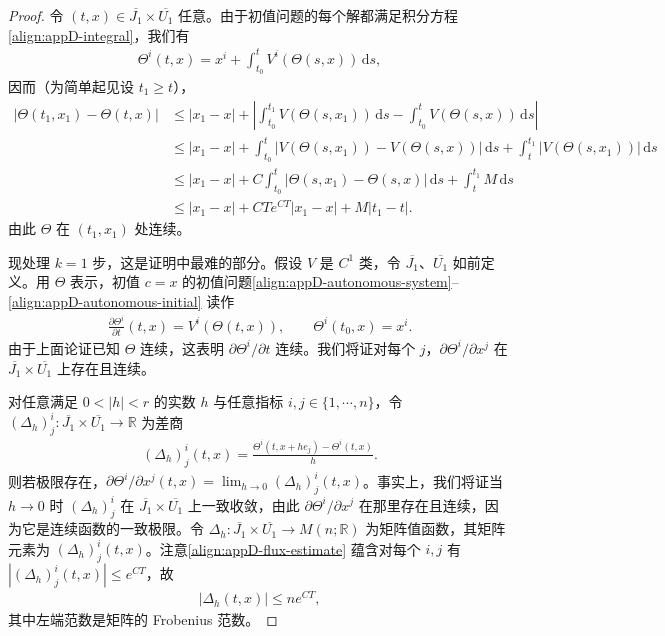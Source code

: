 \documentclass[../../main.tex]{subfiles}
\begin{document}
\begin{proof}
令 $(t,x)\in\overline{J_1}\times\overline{U_1}$ 任意。由于初值问题的每个解都满足积分方程\eqref{align:appD-integral}，我们有
\begin{align}\label{align:appD-flux-integral}
\Theta^i(t,x)=x^i+\int_{t_0}^t V^i(\Theta(s,x))\,\mathrm{d}s,
\end{align}
因而（为简单起见设 $t_1\geqslant t$），
\begin{align*}
|\Theta(t_1,x_1)-\Theta(t,x)|
&\leqslant|x_1-x|+\left|\int_{t_0}^{t_1}V(\Theta(s,x_1))\,\mathrm{d}s-\int_{t_0}^t V(\Theta(s,x))\,\mathrm{d}s\right|\\
&\leqslant|x_1-x|+\int_{t_0}^t|V(\Theta(s,x_1))-V(\Theta(s,x))|\,\mathrm{d}s
+\int_t^{t_1}|V(\Theta(s,x_1))|\,\mathrm{d}s\\
&\leqslant|x_1-x|+C\int_{t_0}^t|\Theta(s,x_1)-\Theta(s,x)|\,\mathrm{d}s+\int_t^{t_1}M\,\mathrm{d}s\\
&\leqslant|x_1-x|+CTe^{CT}|x_1-x|+M|t_1-t|.
\end{align*}
由此 $\Theta$ 在 $(t_1,x_1)$ 处连续。

现处理 $k=1$ 步，这是证明中最难的部分。假设 $V$ 是 $C^1$ 类，令 $\overline{J_1}$、$\overline{U_1}$ 如前定义。用 $\Theta$ 表示，初值 $c=x$ 的初值问题\eqref{align:appD-autonomous-system}--\eqref{align:appD-autonomous-initial} 读作
\begin{align}\label{align:appD-flux-pde}
\frac{\partial\Theta^i}{\partial t}(t,x)=V^i(\Theta(t,x)),\qquad \Theta^i(t_0,x)=x^i.
\end{align}
由于上面论证已知 $\Theta$ 连续，这表明 $\partial\Theta^i/\partial t$ 连续。我们将证对每个 $j$，$\partial\Theta^i/\partial x^j$ 在 $\overline{J_1}\times\overline{U_1}$ 上存在且连续。

对任意满足 $0<|h|<r$ 的实数 $h$ 与任意指标 $i,j\in\{1,\cdots ,n\}$，令 $(\Delta_h)^i_j:\overline{J_1}\times\overline{U_1}\to\mathbb R$ 为差商
\begin{align*}
(\Delta_h)^i_j(t,x)=\frac{\Theta^i(t,x+he_j)-\Theta^i(t,x)}{h}.
\end{align*}
则若极限存在，$\partial\Theta^i/\partial x^j(t,x)=\lim_{h\to0}(\Delta_h)^i_j(t,x)$。事实上，我们将证当 $h\to0$ 时 $(\Delta_h)^i_j$ 在 $\overline{J_1}\times\overline{U_1}$ 上一致收敛，由此 $\partial\Theta^i/\partial x^j$ 在那里存在且连续，因为它是连续函数的一致极限。令 $\Delta_h:\overline{J_1}\times\overline{U_1}\to M(n;\mathbb R)$ 为矩阵值函数，其矩阵元素为 $(\Delta_h)^i_j(t,x)$。注意\eqref{align:appD-flux-estimate} 蕴含对每个 $i,j$ 有 $|(\Delta_h)^i_j(t,x)|\leqslant e^{CT}$，故
\begin{align}\label{align:appD-delta-bound}
|\Delta_h(t,x)|\leqslant ne^{CT},
\end{align}
其中左端范数是矩阵的 Frobenius 范数。


\end{proof}
\end{document}
